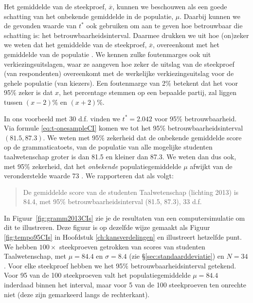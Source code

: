 \documentclass[
]{book}
\begin{document}
Het gemiddelde van de steekproef, \(\overline{x}\), kunnen we beschouwen
als een goede schatting van het onbekende gemiddelde in de populatie,
\(\mu\). Daarbij kunnen we de gevonden waarde van \(t^*\) ook gebruiken om
aan te geven hoe betrouwbaar die schatting is: het
betrouwbaarheidsinterval. Daarmee drukken we uit hoe (on)zeker we weten
dat het gemiddelde van de steekproef, \(\overline{x}\), overeenkomt met
het gemiddelde van de populatie \citep{Cumm12}. We kennen zulke foutenmarges
ook uit verkiezingsuitslagen, waar ze aangeven hoe zeker de uitslag van
de steekproef (van respondenten) overeenkomt met de werkelijke
verkiezingsuitslag voor de gehele populatie (van kiezers). Een
foutenmarge van 2\% betekent dat het voor 95\% zeker is dat \(x\), het
percentage stemmen op een bepaalde partij, zal liggen tussen \((x-2)\)\% en
\((x+2)\)\%.

In ons voorbeeld met 30 d.f. vinden we \(t^*=2.042\) voor 95\%
betrouwbaarheid. Via formule
\eqref{eq:t-onesampleCI} komen we tot het 95\%
betrouwbaarheidsinterval \((81.5, 87.3)\). We weten met 95\% zekerheid dat
de onbekende gemiddelde score op de grammaticatoets, van de populatie
van alle mogelijke studenten taalwetenschap groter is dan 81.5 en
kleiner dan 87.3. We weten dan dus ook, met 95\% zekerheid, dat het
\emph{onbekende} populatiegemiddelde \(\mu\) afwijkt van de veronderstelde
waarde 73 \citep{Cumm12}. We rapporteren dat als volgt:

\begin{quote}
De gemiddelde score van de studenten Taalwetenschap (lichting 2013) is
84.4, met 95\% betrouwbaarheidsinterval (81.5, 87.3), 33 d.f.
\end{quote}

In Figuur~\ref{fig:gramm2013CIs} zie je de resultaten van een
computersimulatie om dit te illustreren. Deze figuur is op dezelfde wijze gemaakt als Figuur \ref{fig:tempo95CIs} in Hoofdstuk \ref{ch:kansverdelingen} en illustreert hetzelfde punt.
We hebben \(100\times\)
steekproeven getrokken van scores van studenten Taalwetenschap, met
\(\mu=84.4\) en \(\sigma=8.4\) (zie
§\ref{sec:standaarddeviatie}) en \(N=34\). Voor elke steekproef
hebben we het 95\% betrouwbaarheidsinterval getekend. Voor 95 van de 100
steekproeven valt het populatiegemiddelde \(\mu=84.4\) inderdaad binnen
het interval, maar voor 5 van de 100 steekproeven ten onrechte niet
(deze zijn gemarkeerd langs de rechterkant).
\end{document}
